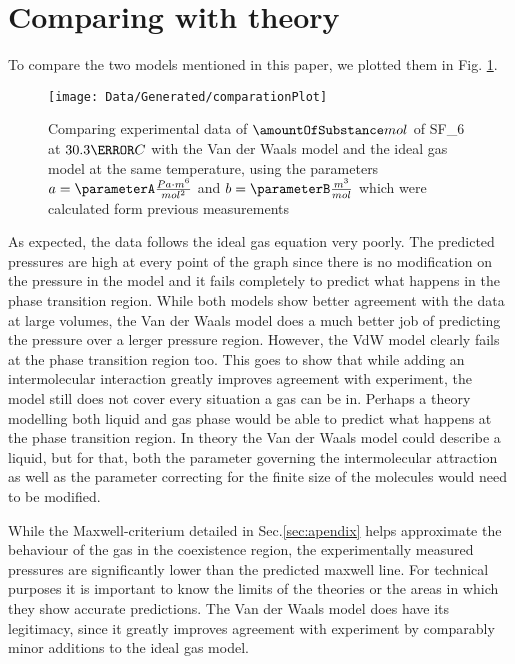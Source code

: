 \documentclass[a4paper,10pt,twocolumn]{article}
\begin{document}
    \section{Comparing with theory}\label{sec:comaringTheory}
    To compare the two models mentioned in this paper, we plotted them in Fig.  \ref{fig:comparingTheories}.
    \begin{figure}
        \begin{center}
            \texttt{[image: Data/Generated/comparationPlot]}
            \caption[]{Comparing experimental data of $\amountOfSubstance mol$ of SF_6\) at $30.3\degree C$ with the Van der Waals model and the ideal gas model at the same temperature, using the parameters $a=\parameterA \frac{Pa\cdot m^6}{mol^2}$ and $b=\parameterB \frac{m^3}{mol}$ which
            were calculated form previous measurements}
            \label{fig:comparingTheories}
        \end{center}
    \end{figure}
    As expected, the data follows the ideal gas equation very poorly.
    The predicted pressures are high at every point of the graph since there is no modification on the pressure in the model and it fails completely to predict what happens in the phase transition region.
    While both models show better agreement with the data at large volumes, the Van der Waals model does a much better job of predicting the pressure over a lerger pressure region.
    However, the VdW model clearly fails at the phase transition region too.
    This goes to show that while adding an intermolecular interaction greatly improves agreement with experiment, the model still does not cover every situation a gas can be in.
    Perhaps a theory modelling both liquid and gas phase would be able to predict what happens at the phase transition region.
    In theory the Van der Waals model could describe a liquid, but for that, both the parameter governing the intermolecular attraction as well as the parameter correcting for the finite size of the molecules would need to be modified.
    
    While the Maxwell-criterium detailed in Sec.\ref{sec:apendix} helps approximate the behaviour of the gas in the coexistence region, the experimentally measured pressures are significantly lower than the predicted maxwell line.
    For technical purposes it is important to know the limits of the theories or the areas in which they show accurate predictions.
    The Van der Waals model does have its legitimacy, since it greatly improves agreement with experiment by comparably minor additions to the ideal gas model.
    
\end{document}
